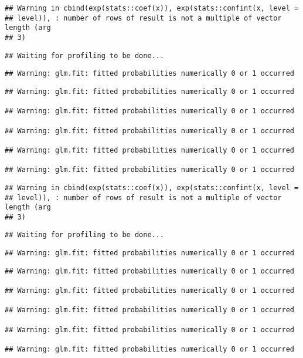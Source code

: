 \documentclass[]{article}
\begin{document}
\begin{verbatim}
## Warning in cbind(exp(stats::coef(x)), exp(stats::confint(x, level =
## level)), : number of rows of result is not a multiple of vector length (arg
## 3)
\end{verbatim}

\begin{verbatim}
## Waiting for profiling to be done...
\end{verbatim}

\begin{verbatim}
## Warning: glm.fit: fitted probabilities numerically 0 or 1 occurred
\end{verbatim}

\begin{verbatim}
## Warning: glm.fit: fitted probabilities numerically 0 or 1 occurred

## Warning: glm.fit: fitted probabilities numerically 0 or 1 occurred

## Warning: glm.fit: fitted probabilities numerically 0 or 1 occurred

## Warning: glm.fit: fitted probabilities numerically 0 or 1 occurred

## Warning: glm.fit: fitted probabilities numerically 0 or 1 occurred
\end{verbatim}

\begin{verbatim}
## Warning in cbind(exp(stats::coef(x)), exp(stats::confint(x, level =
## level)), : number of rows of result is not a multiple of vector length (arg
## 3)
\end{verbatim}

\begin{verbatim}
## Waiting for profiling to be done...
\end{verbatim}

\begin{verbatim}
## Warning: glm.fit: fitted probabilities numerically 0 or 1 occurred
\end{verbatim}

\begin{verbatim}
## Warning: glm.fit: fitted probabilities numerically 0 or 1 occurred

## Warning: glm.fit: fitted probabilities numerically 0 or 1 occurred

## Warning: glm.fit: fitted probabilities numerically 0 or 1 occurred

## Warning: glm.fit: fitted probabilities numerically 0 or 1 occurred

## Warning: glm.fit: fitted probabilities numerically 0 or 1 occurred
\end{verbatim}
\end{document}
